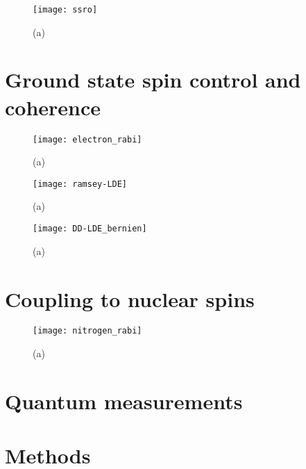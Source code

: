 \begin{figure*}
	\centering
	\texttt{[image: ssro]}
	\caption{\label{fig:tam-fig6-ssro} \textbf{} (a) }
\end{figure*}

\section{Ground state spin control and coherence}
\label{sec:groundstatecontrol}
\begin{figure*}
	\centering
	\texttt{[image: electron\_rabi]}
	\caption{\label{fig:tam-fig7-erabi} \textbf{} (a) }
\end{figure*}

\begin{figure*}
	\centering
	\texttt{[image: ramsey-LDE]}
	\caption{\label{fig:tam-fig8-eramsey} \textbf{} (a) }
\end{figure*}

\begin{figure*}
	\centering
	\texttt{[image: DD-LDE\_bernien]}
	\caption{\label{fig:tam-fig9-DD} \textbf{} (a) }
\end{figure*}

\section{Coupling to nuclear spins}
\label{sec:nuclearspins}
\begin{figure*}
	\centering
	\texttt{[image: nitrogen\_rabi]}
	\caption{\label{fig:tam-fig10-nrabi} \textbf{} (a) }
\end{figure*}
\section{Quantum measurements}


\section{Methods}



\newpage




